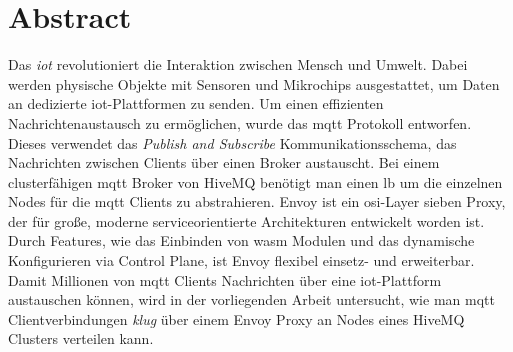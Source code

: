 \section*{Abstract}
Das \textit{\ac{iot}} revolutioniert die Interaktion zwischen Mensch und Umwelt.
Dabei werden physische Objekte mit Sensoren und Mikrochips ausgestattet, um Daten an dedizierte \ac{iot}-Plattformen zu senden.
Um einen effizienten Nachrichtenaustausch zu ermöglichen, wurde das \ac{mqtt} Protokoll entworfen. Dieses verwendet das \textit{Publish and Subscribe} Kommunikationsschema, das Nachrichten zwischen Clients über einen Broker austauscht.
Bei einem clusterfähigen \ac{mqtt} Broker von HiveMQ benötigt man einen \acl{lb} um die einzelnen Nodes für die \ac{mqtt} Clients zu abstrahieren.
Envoy ist ein \acs{osi}-Layer sieben Proxy, der für gro{\ss}e, moderne serviceorientierte Architekturen entwickelt worden ist.
Durch Features, wie das Einbinden von \acs{wasm} Modulen und das dynamische Konfigurieren via Control Plane, ist Envoy flexibel einsetz- und erweiterbar.
Damit Millionen von \ac{mqtt} Clients Nachrichten über eine \ac{iot}-Plattform austauschen können, wird in der vorliegenden Arbeit untersucht, wie man \ac{mqtt} Clientverbindungen \textit{klug} über einem Envoy Proxy an Nodes eines HiveMQ Clusters verteilen kann.
\newpage

